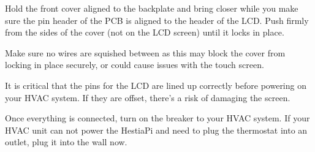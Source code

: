 Hold the front cover aligned to the backplate and bring closer while you make
sure the pin header of the PCB is aligned to the header of the LCD. Push firmly
from the sides of the cover (not on the LCD screen) until it locks in place.

Make sure no wires are squished between as this may block the cover from
locking in place securely, or could cause issues with the touch screen.

It is critical that the pins for the LCD are lined up correctly before powering
on your HVAC system. If they are offset, there's a risk of damaging the screen.

Once everything is connected, turn on the breaker to your HVAC system. If your
HVAC unit can not power the HestiaPi and need to plug the thermostat into an
outlet, plug it into the wall now.
